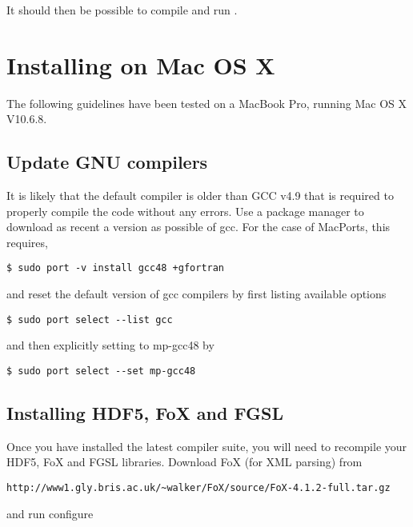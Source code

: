 It should then be possible to compile and run \glc.

\section{Installing on Mac OS X}

The following guidelines have been tested on a MacBook Pro, running Mac OS X V10.6.8. 

\subsection{Update GNU compilers}

It is likely that the default compiler is older than GCC v4.9 that is required to properly compile the code without any errors. Use a package manager to download as recent a version as possible of {\normalfont \ttfamily gcc}. For the case of MacPorts, this requires,

\begin{verbatim}
$ sudo port -v install gcc48 +gfortran
\end{verbatim}

and reset the default version of {\normalfont \ttfamily gcc} compilers by first listing available options

\begin{verbatim}
$ sudo port select --list gcc
\end{verbatim}

and then explicitly setting to {\normalfont \ttfamily mp-gcc48} by

\begin{verbatim}
$ sudo port select --set mp-gcc48
\end{verbatim}

\subsection{Installing HDF5, FoX and FGSL}

Once you have installed the latest compiler suite, you will need to recompile your {\normalfont \ttfamily HDF5}, {\normalfont \ttfamily FoX} and {\normalfont \ttfamily FGSL} libraries. Download {\normalfont \ttfamily FoX} (for XML parsing) from

\begin{verbatim}
http://www1.gly.bris.ac.uk/~walker/FoX/source/FoX-4.1.2-full.tar.gz
\end{verbatim}

and run {\normalfont \ttfamily configure}

